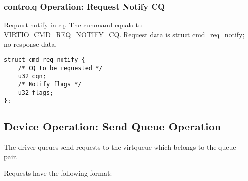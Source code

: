 \subsubsection{controlq Operation: Request Notify CQ}\label{sec:Device Types / RDMA Device / controlq Operation / Request Notify CQ}

Request notify in cq. The command equals to VIRTIO_CMD_REQ_NOTIFY_CQ.
Request data is struct cmd_req_notify; no response data.

\begin{lstlisting}
struct cmd_req_notify {
    /* CQ to be requested */
    u32 cqn;
    /* Notify flags */
    u32 flags;
};
\end{lstlisting}

\subsection{Device Operation: Send Queue Operation}\label{sec:Device Types / RDMA Device / Send Queue Operation}

The driver queues send requests to the virtqueue which belongs to the queue pair.

Requests have the following format:

